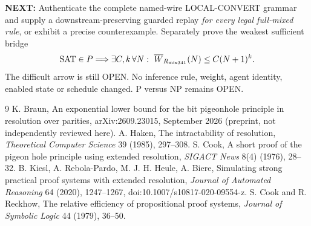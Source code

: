 \documentclass[11pt]{article}
\begin{document}
\noindent\textbf{NEXT:} Authenticate the complete named-wire LOCAL-CONVERT grammar and supply a downstream-preserving guarded replay \emph{for every legal full-mixed rule}, or exhibit a precise counterexample. Separately prove the weakest sufficient bridge
\[
\mathrm{SAT}\in P\Longrightarrow \exists C,k\,\forall N:\ \overline W_{R_{\rm mix341}}(N)\le C(N+1)^k .
\]
The difficult arrow is still OPEN. No inference rule, weight, agent identity, enabled state or schedule changed. P versus NP remains OPEN.

\begin{thebibliography}{9}
 K. Braun, An exponential lower bound for the bit pigeonhole principle in resolution over parities, arXiv:2609.23015, September 2026 (preprint, not independently reviewed here).
 A. Haken, The intractability of resolution, \emph{Theoretical Computer Science} 39 (1985), 297--308.
 S. Cook, A short proof of the pigeon hole principle using extended resolution, \emph{SIGACT News} 8(4) (1976), 28--32.
 B. Kiesl, A. Rebola-Pardo, M. J. H. Heule, A. Biere, Simulating strong practical proof systems with extended resolution, \emph{Journal of Automated Reasoning} 64 (2020), 1247--1267, doi:10.1007/s10817-020-09554-z.
 S. Cook and R. Reckhow, The relative efficiency of propositional proof systems, \emph{Journal of Symbolic Logic} 44 (1979), 36--50.
\end{thebibliography}
\end{document}
